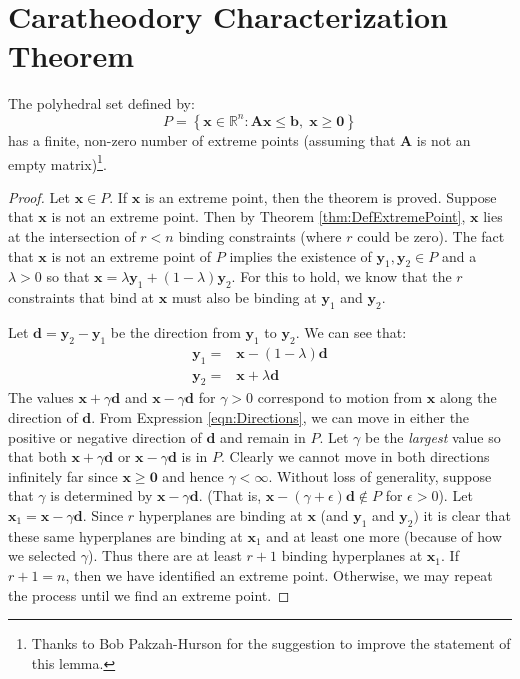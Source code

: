 \section{Caratheodory Characterization Theorem}
\begin{lemma} The polyhedral set defined by:
\begin{displaymath}
P = \left\{\mathbf{x} \in \mathbb{R}^n : \mathbf{A} \mathbf{x} \leq \mathbf{b},\;\mathbf{x} \geq \mathbf{0}\right\}
\end{displaymath}
has a finite, non-zero number of extreme points (assuming that $\mathbf{A}$ is not an empty matrix)\footnote{Thanks to Bob Pakzah-Hurson for the suggestion to improve the statement of this lemma.}.
\label{lem:FiniteExtremePoints}
\end{lemma}
\begin{proof} 
Let $\mathbf{x} \in P$. If $\mathbf{x}$ is an extreme point, then the theorem is proved. Suppose that $\mathbf{x}$ is not an extreme point. Then by Theorem \ref{thm:DefExtremePoint}, $\mathbf{x}$ lies at the intersection of $r < n$ binding constraints (where $r$ could be zero). The fact that $\mathbf{x}$ is not an extreme point of $P$ implies the existence of $\mathbf{y}_1, \mathbf{y}_2 \in P$ and a $\lambda > 0$ so that $\mathbf{x} = \lambda\mathbf{y}_1 + (1 - \lambda)\mathbf{y}_2$. For this to hold, we know that the $r$ constraints that bind at $\mathbf{x}$ must also be binding at $\mathbf{y}_1$ and $\mathbf{y}_2$.

Let $\mathbf{d} = \mathbf{y}_2 - \mathbf{y}_1$ be the direction from $\mathbf{y}_1$ to $\mathbf{y}_2$. We can see that:
\begin{equation}
\begin{aligned}
\mathbf{y}_1 = &\mathbf{x} - (1-\lambda)\mathbf{d}\\
\mathbf{y}_2 = &\mathbf{x} + \lambda\mathbf{d}
\end{aligned}
\label{eqn:Directions}
\end{equation}
The values $\mathbf{x} + \gamma\mathbf{d}$ and $\mathbf{x} - \gamma\mathbf{d}$ for $\gamma > 0$ correspond to motion from $\mathbf{x}$ along the direction of $\mathbf{d}$. From Expression \ref{eqn:Directions}, we can move in either the positive or negative direction of $\mathbf{d}$ and remain in $P$. Let $\gamma$ be the \textit{largest} value so that both $\mathbf{x} + \gamma\mathbf{d}$ or $\mathbf{x} - \gamma\mathbf{d}$ is in $P$. Clearly we cannot move in both directions infinitely far since $\mathbf{x} \geq \mathbf{0}$ and hence $\gamma < \infty$. Without loss of generality, suppose that $\gamma$ is determined by $\mathbf{x} - \gamma\mathbf{d}$. (That is, $\mathbf{x} - (\gamma + \epsilon)\mathbf{d} \not\in P$ for $\epsilon > 0$). Let $\mathbf{x}_1 = \mathbf{x} - \gamma\mathbf{d}$. Since $r$ hyperplanes are binding at $\mathbf{x}$ (and $\mathbf{y}_1$ and $\mathbf{y}_2)$ it is clear that these same hyperplanes are binding at $\mathbf{x}_1$ and at least one more (because of how we selected $\gamma$). Thus there are at least $r+1$ binding hyperplanes at $\mathbf{x}_1$. If $r+1 = n$, then we have identified an extreme point. Otherwise, we may repeat the process until we find an extreme point. 


\end{proof}
